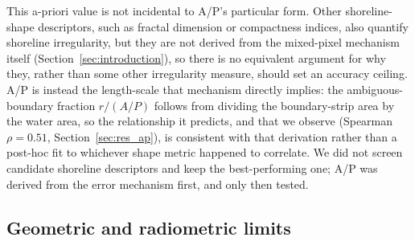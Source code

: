 This a-priori value is not incidental to A/P's particular form. Other
shoreline-shape descriptors, such as fractal dimension or compactness
indices, also quantify shoreline irregularity, but they are not derived
from the mixed-pixel mechanism itself (Section~\ref{sec:introduction}), so
there is no equivalent argument for why they, rather than some other
irregularity measure, should set an accuracy ceiling. A/P is instead the
length-scale that mechanism directly implies: the ambiguous-boundary
fraction $r/(A/P)$ follows from dividing the boundary-strip area by the
water area, so the relationship it predicts, and that we observe (Spearman
$\rho=0.51$, Section~\ref{sec:res_ap}), is consistent with that derivation
rather than a post-hoc fit to whichever shape metric happened to correlate.
We did not screen candidate shoreline descriptors and keep the
best-performing one; A/P was derived from the error mechanism first, and
only then tested.

\subsection{Geometric and radiometric limits}
\label{sec:disc_geo_radio}

